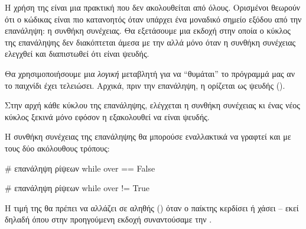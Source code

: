 \documentclass[a4paper,11pt,oneside]{book}
\begin{document}
Η χρήση της  είναι μια πρακτική που δεν ακολουθείται από όλους. Ορισμένοι θεωρούν ότι ο κώδικας είναι πιο κατανοητός όταν υπάρχει ένα μοναδικό σημείο εξόδου από την επανάληψη: η συνθήκη συνέχειας. Θα εξετάσουμε μια εκδοχή στην οποία ο κύκλος της επανάληψης δεν διακόπτεται άμεσα με την  αλλά μόνο όταν η συνθήκη συνέχειας ελεγχθεί και διαπιστωθεί ότι είναι ψευδής.


Θα χρησιμοποιήσουμε μια \emph{λογική} %
μεταβλητή  για να ``θυμάται'' το πρόγραμμά μας αν το παιχνίδι έχει τελειώσει. Αρχικά, πριν την επανάληψη, η  ορίζεται ως ψευδής ().


\clearpage
Στην αρχή κάθε κύκλου της επανάληψης, ελέγχεται η συνθήκη συνέχειας  κι ένας νέος κύκλος ξεκινά μόνο εφόσον η  εξακολουθεί να είναι ψευδής.


Η συνθήκη συνέχειας της επανάληψης θα μπορούσε εναλλακτικά να γραφτεί και με τους δύο ακόλουθους τρόπους:

\begin{pycode}
    # επανάληψη ρίψεων
    while over == False
\end{pycode}

%
\begin{pycode}
    # επανάληψη ρίψεων
    while over != True
\end{pycode}

Η τιμή της  θα πρέπει να αλλάζει σε αληθής () όταν ο παίκτης κερδίσει ή χάσει -- εκεί δηλαδή όπου στην προηγούμενη εκδοχή συναντούσαμε την . 
\end{document}
